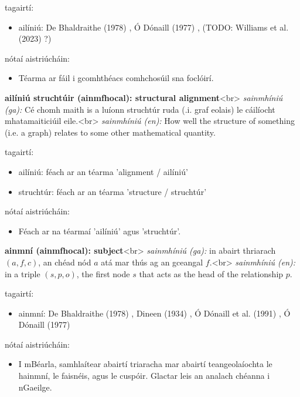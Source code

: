 \documentclass{article}
\begin{document}
tagairtí:
\begin{itemize}
	\item ailíniú: De Bhaldraithe (1978) \cite{de-bhaldraithe}, Ó Dónaill (1977) \cite{odonaill}, (TODO: Williams et al. (2023) \cite{storchiste}?)
\end{itemize}

nótaí aistriúcháin:
\begin{itemize}
	\item Téarma ar fáil i gcomhthéacs comhchosúil sna foclóirí.
\end{itemize}


\textbf{ailíniú struchtúir (ainmfhocal): structural alignment}<br>
\textit{sainmhíniú (ga):} Cé chomh maith is a luíonn struchtúr ruda (.i. graf eolais) le cáilíocht mhatamaiticiúil eile.<br>
\textit{sainmhíniú (en):} How well the structure of something (i.e. a graph) relates to some other mathematical quantity.

tagairtí:
\begin{itemize}
	\item ailíniú: féach ar an téarma 'alignment / ailíniú'
	\item struchtúr: féach ar an téarma 'structure / struchtúr'
\end{itemize}

nótaí aistriúcháin:
\begin{itemize}
	\item Féach ar na téarmaí 'ailíniú' agus 'struchtúr'.
\end{itemize}


\textbf{ainmní (ainmfhocal): subject}<br>
\textit{sainmhíniú (ga):} in abairt thriarach $(a,f,c)$, an chéad nód $a$ atá mar thús ag an gceangal $f$.<br>
\textit{sainmhíniú (en):} in a triple $(s,p,o)$, the first node $s$ that acts as the head of the relationship $p$.

tagairtí:
\begin{itemize}
	\item ainmní: De Bhaldraithe (1978) \cite{de-bhaldraithe}, Dineen (1934) \cite{dineen}, Ó Dónaill et al. (1991) \cite{focloir-beag}, Ó Dónaill (1977) \cite{odonaill}
\end{itemize}

nótaí aistriúcháin:
\begin{itemize}
	\item I mBéarla, samhlaítear abairtí triaracha mar abairtí teangeolaíochta le hainmní, le faisnéis, agus le cuspóir. Glactar leis an analach chéanna i nGaeilge.
\end{itemize}
\end{document}

